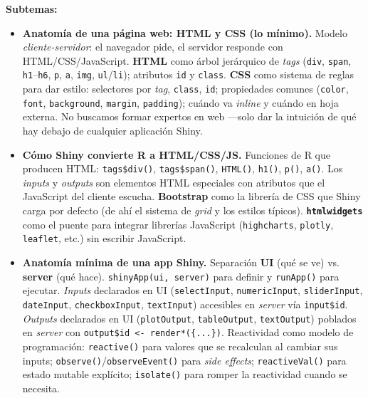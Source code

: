 \documentclass[11pt,letterpaper]{article}
\newcommand{\blue}[1]{{\color{cerulean}#1}}
\begin{document}
\textbf{Subtemas:}

\begin{itemize}[leftmargin=*, itemsep=2pt]
    \item \textbf{Anatomía de una página web: HTML y CSS (lo mínimo).} Modelo \textit{cliente-servidor}: el navegador pide, el servidor responde con HTML/CSS/JavaScript. \textbf{HTML} como árbol jerárquico de \textit{tags} (\texttt{div}, \texttt{span}, \texttt{h1}--\texttt{h6}, \texttt{p}, \texttt{a}, \texttt{img}, \texttt{ul}/\texttt{li}); atributos \texttt{id} y \texttt{class}. \textbf{CSS} como sistema de reglas para dar estilo: selectores por \textit{tag}, \texttt{class}, \texttt{id}; propiedades comunes (\texttt{color}, \texttt{font}, \texttt{background}, \texttt{margin}, \texttt{padding}); cuándo va \textit{inline} y cuándo en hoja externa. No buscamos formar expertos en web ---solo dar la intuición de qué hay debajo de cualquier aplicación Shiny.
    \item \textbf{Cómo Shiny convierte R a HTML/CSS/JS.} Funciones de R que producen HTML: \texttt{tags\$div()}, \texttt{tags\$span()}, \texttt{HTML()}, \texttt{h1()}, \texttt{p()}, \texttt{a()}. Los \textit{inputs} y \textit{outputs} son elementos HTML especiales con atributos que el JavaScript del cliente escucha. \textbf{Bootstrap} como la librería de CSS que Shiny carga por defecto (de ahí el sistema de \textit{grid} y los estilos típicos). \textbf{\texttt{htmlwidgets}} como el puente para integrar librerías JavaScript (\texttt{highcharts}, \texttt{plotly}, \texttt{leaflet}, etc.) sin escribir JavaScript.
    \item \textbf{Anatomía mínima de una app Shiny.} Separación \textbf{UI} (qué se ve) vs. \textbf{server} (qué hace). \texttt{shinyApp(ui, server)} para definir y \texttt{runApp()} para ejecutar. \textit{Inputs} declarados en UI (\texttt{selectInput}, \texttt{numericInput}, \texttt{sliderInput}, \texttt{dateInput}, \texttt{checkboxInput}, \texttt{textInput}) accesibles en \textit{server} vía \texttt{input\$id}. \textit{Outputs} declarados en UI (\texttt{plotOutput}, \texttt{tableOutput}, \texttt{textOutput}) poblados en \textit{server} con \texttt{output\$id <- render*(\{...\})}. \blue{Reactividad} como modelo de programación: \texttt{reactive()} para valores que se recalculan al cambiar sus inputs; \texttt{observe()}/\texttt{observeEvent()} para \textit{side effects}; \texttt{reactiveVal()} para estado mutable explícito; \texttt{isolate()} para romper la reactividad cuando se necesita.

\end{itemize}
\end{document}
